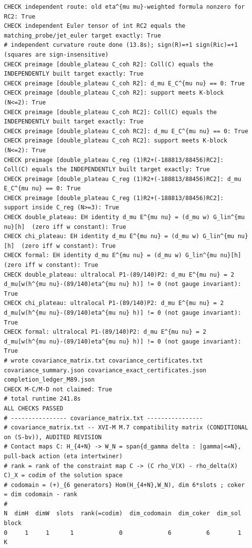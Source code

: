 \documentclass{article}
\theoremstyle{remark}
\begin{document}
\begin{lstlisting}
CHECK independent route: old eta^{mu mu}-weighted formula nonzero for RC2: True
CHECK independent Euler tensor of int RC2 equals the matching_probe/jet_euler target exactly: True
# independent curvature route done (13.8s); sign(R)=+1 sign(Ric)=+1 (squares are sign-insensitive)
CHECK preimage [double_plateau C_coh R2]: Coll(C) equals the INDEPENDENTLY built target exactly: True
CHECK preimage [double_plateau C_coh R2]: d_mu E_C^{mu nu} == 0: True
CHECK preimage [double_plateau C_coh R2]: support meets K-block (N<=2): True
CHECK preimage [double_plateau C_coh RC2]: Coll(C) equals the INDEPENDENTLY built target exactly: True
CHECK preimage [double_plateau C_coh RC2]: d_mu E_C^{mu nu} == 0: True
CHECK preimage [double_plateau C_coh RC2]: support meets K-block (N<=2): True
CHECK preimage [double_plateau C_reg (1)R2+(-188813/88456)RC2]: Coll(C) equals the INDEPENDENTLY built target exactly: True
CHECK preimage [double_plateau C_reg (1)R2+(-188813/88456)RC2]: d_mu E_C^{mu nu} == 0: True
CHECK preimage [double_plateau C_reg (1)R2+(-188813/88456)RC2]: support inside C_reg (N>=3): True
CHECK double_plateau: EH identity d_mu E^{mu nu} = (d_mu w) G_lin^{mu nu}[h]  (zero iff w constant): True
CHECK chi_plateau: EH identity d_mu E^{mu nu} = (d_mu w) G_lin^{mu nu}[h]  (zero iff w constant): True
CHECK formal: EH identity d_mu E^{mu nu} = (d_mu w) G_lin^{mu nu}[h]  (zero iff w constant): True
CHECK double_plateau: ultralocal P1-(89/140)P2: d_mu E^{mu nu} = 2 d_mu[w(h^{mu nu}-(89/140)eta^{mu nu} h)] != 0 (not gauge invariant): True
CHECK chi_plateau: ultralocal P1-(89/140)P2: d_mu E^{mu nu} = 2 d_mu[w(h^{mu nu}-(89/140)eta^{mu nu} h)] != 0 (not gauge invariant): True
CHECK formal: ultralocal P1-(89/140)P2: d_mu E^{mu nu} = 2 d_mu[w(h^{mu nu}-(89/140)eta^{mu nu} h)] != 0 (not gauge invariant): True
# wrote covariance_matrix.txt covariance_certificates.txt covariance_summary.json covariance_exact_certificates.json completion_ledger_M89.json
CHECK M-C/M-D not claimed: True
# total runtime 241.8s
ALL CHECKS PASSED
# ---------------- covariance_matrix.txt ----------------
# covariance_matrix.txt -- XVI-M M.7 compatibility matrix (CONDITIONAL on (S-bv)), AUDITED REVISION
# Contact maps C: H_{4+N} -> W_N = span{d_gamma delta : |gamma|<=N}, pull-back action (eta intertwiner)
# rank = rank of the constraint map C -> (C rho_V(X) - rho_delta(X) C)_X = codim of the solution space
# codomain = (+)_{6 generators} Hom(H_{4+N},W_N), dim 6*slots ; coker = dim codomain - rank
#
N  dimH  dimW  slots  rank(=codim)  dim_codomain  dim_coker  dim_sol  block
0     1     1      1             0             6          6        1  K

\end{lstlisting}
\end{document}

